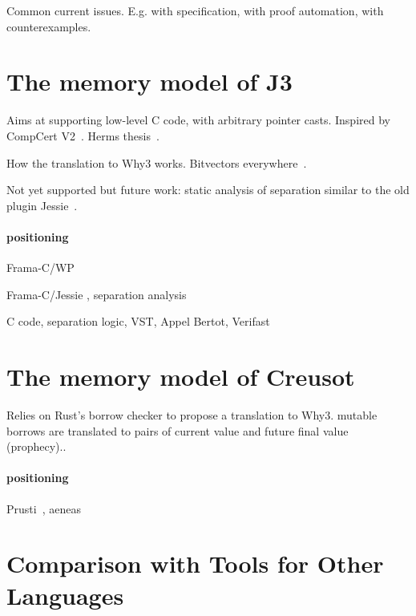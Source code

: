 \documentclass[a4paper,11pt]{article}
\begin{document}
Common current issues. E.g. with specification, with proof automation, with
counterexamples.

\section{The memory model of J3}
\label{sec:j3}

Aims at supporting low-level C code, with arbitrary pointer casts. Inspired by
CompCert V2~\cite{leroy12rr}. Herms thesis~\cite{herms13phd}.

How the translation to Why3 works. Bitvectors everywhere~\cite{fumex16nfm}.

Not yet supported but future work: static analysis
of separation similar to the old plugin
Jessie~\cite{hubert2008these,hubert07hav}.


\paragraph{positioning}

Frama-C/WP~\cite{blanchard2024wp}

Frama-C/Jessie , separation analysis~\cite{hubert2008these,hubert07hav}

C code, separation logic, VST, Appel Bertot, Verifast


\section{The memory model of Creusot}
\label{sec:creusot}


Relies on Rust's borrow checker to propose a translation to Why3. mutable
borrows are translated to pairs of current value and future final value
(prophecy).\cite{denis23phd,denis22icfem,matsushita22pldi}.

\paragraph{positioning}

Prusti~\cite{astrauskas19oopsla}, aeneas~\cite{ho22icfp}


\section{Comparison with Tools for Other Languages}
\label{sec:related}
\end{document}
